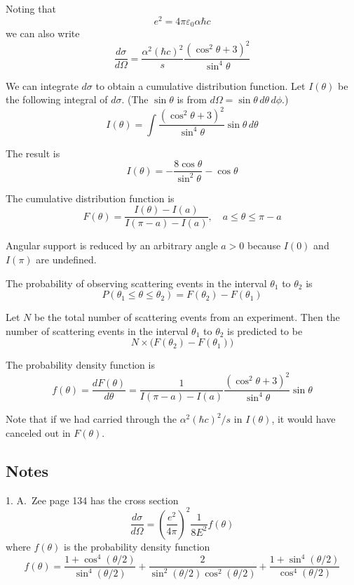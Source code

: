 \documentclass[12pt]{article}
\begin{document}
Noting that
\begin{equation*}
e^2=4\pi\varepsilon_0\alpha\hbar c
\end{equation*}
we can also write
\begin{equation*}
\frac{d\sigma}{d\Omega}=\frac{\alpha^2(\hbar c)^2}{s}
\frac{(\cos^2\theta+3)^2}{\sin^4\theta}
\end{equation*}

We can integrate $d\sigma$ to obtain a cumulative distribution function.
Let $I(\theta)$ be the following integral of $d\sigma$.
(The $\sin\theta$ is from $d\Omega=\sin\theta\,d\theta\,d\phi$.)
\begin{equation*}
I(\theta)=\int\frac{\left(\cos^2\theta+3\right)^2}{\sin^4\theta}\sin\theta\,d\theta
\end{equation*}

The result is
\begin{equation*}
I(\theta)=-\frac{8\cos\theta}{\sin^2\theta}-\cos\theta
\end{equation*}

The cumulative distribution function is
\begin{equation*}
F(\theta)=\frac{I(\theta)-I(a)}{I(\pi-a)-I(a)},
\quad
a\le\theta\le\pi-a
\end{equation*}

Angular support is reduced by an arbitrary angle $a>0$ because $I(0)$ and $I(\pi)$ are undefined.

\bigskip
The probability of observing scattering events in the interval $\theta_1$ to $\theta_2$ is
\begin{equation*}
P(\theta_1\le\theta\le\theta_2)=F(\theta_2)-F(\theta_1)
\end{equation*}

Let $N$ be the total number of scattering events from an experiment.
Then the number of scattering events in the interval $\theta_1$
to $\theta_2$ is predicted to be
$$
N\times\bigl(F(\theta_2)-F(\theta_1)\bigr)
$$

The probability density function is
$$
f(\theta)=\frac{dF(\theta)}{d\theta}
=\frac{1}{I(\pi-a)-I(a)}
\frac{\left(\cos^2\theta+3\right)^2}{\sin^4\theta}\sin\theta
$$

Note that if we had carried through the $\alpha^2(\hbar c)^2/s$ in $I(\theta)$,
it would have canceled out in $F(\theta)$.

\subsection*{Notes}
1. A.~Zee page 134 has the cross section
\begin{equation*}
\frac{d\sigma}{d\Omega}=\left(\frac{e^2}{4\pi}\right)^2\frac{1}{8E^2}f(\theta)
\end{equation*}
where $f(\theta)$ is the probability density function
\begin{equation*}
f(\theta)=
\frac{1+\cos^4(\theta/2)}{\sin^4(\theta/2)}
+\frac{2}{\sin^2(\theta/2)\cos^2(\theta/2)}
+\frac{1+\sin^4(\theta/2)}{\cos^4(\theta/2)}
\end{equation*}
\end{document}
